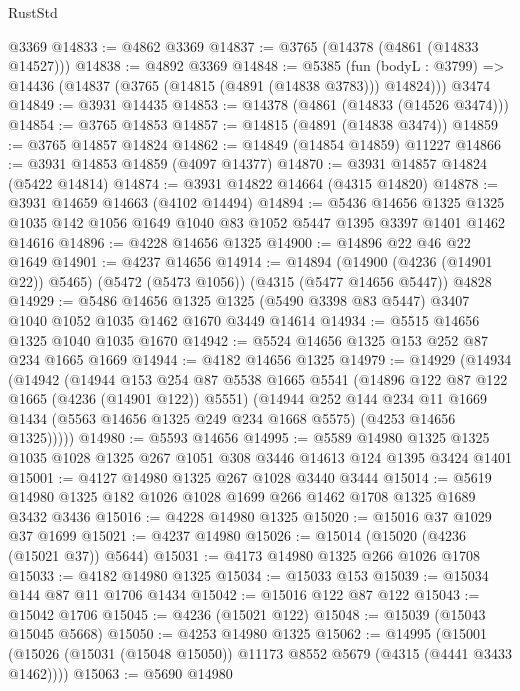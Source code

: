 \begin{lexlean}{RustStd}
\begin{coremodule}
    @3369
@14833 := @4862 @3369
@14837 := @3765 (@14378 (@4861 (@14833 @14527)))
@14838 := @4892 @3369
@14848 := @5385
    (fun (bodyL : @3799) => @14436 (@14837 (@3765 (@14815 (@4891 (@14838 @3783))) @14824)))
    @3474
@14849 := @3931 @14435
@14853 := @14378 (@4861 (@14833 (@14526 @3474)))
@14854 := @3765 @14853
@14857 := @14815 (@4891 (@14838 @3474))
@14859 := @3765 @14857 @14824
@14862 := @14849 (@14854 @14859) @11227
@14866 := @3931 @14853 @14859 (@4097 @14377)
@14870 := @3931 @14857 @14824 (@5422 @14814)
@14874 := @3931 @14822 @14664 (@4315 @14820)
@14878 := @3931 @14659 @14663 (@4102 @14494)
@14894 := @5436
    @14656
    @1325
    @1325
    @1035
    @142
    @1056
    @1649
    @1040
    @83
    @1052
    @5447
    @1395
    @3397
    @1401
    @1462
    @14616
@14896 := @4228 @14656 @1325
@14900 := @14896 @22 @46 @22 @1649
@14901 := @4237 @14656
@14914 := @14894
    (@14900 (@4236 (@14901 @22)) @5465)
    (@5472 (@5473 @1056))
    (@4315 (@5477 @14656 @5447))
    @4828
@14929 := @5486
    @14656
    @1325
    @1325
    (@5490 @3398 @83 @5447)
    @3407
    @1040
    @1052
    @1035
    @1462
    @1670
    @3449
    @14614
@14934 := @5515 @14656 @1325 @1040 @1035 @1670
@14942 := @5524 @14656 @1325 @153 @252 @87 @234 @1665 @1669
@14944 := @4182 @14656 @1325
@14979 := @14929
    (@14934
      (@14942
        (@14944
          @153
          @254
          @87
          @5538
          @1665
          @5541
          (@14896 @122 @87 @122 @1665 (@4236 (@14901 @122)) @5551)
          (@14944
            @252
            @144
            @234
            @11
            @1669
            @1434
            (@5563 @14656 @1325 @249 @234 @1668 @5575)
            (@4253 @14656 @1325)))))
@14980 := @5593 @14656
@14995 := @5589
    @14980
    @1325
    @1325
    @1035
    @1028
    @1325
    @267
    @1051
    @308
    @3446
    @14613
    @124
    @1395
    @3424
    @1401
@15001 := @4127 @14980 @1325 @267 @1028 @3440 @3444
@15014 := @5619 @14980 @1325 @182 @1026 @1028 @1699 @266 @1462 @1708 @1325 @1689 @3432 @3436
@15016 := @4228 @14980 @1325
@15020 := @15016 @37 @1029 @37 @1699
@15021 := @4237 @14980
@15026 := @15014 (@15020 (@4236 (@15021 @37)) @5644)
@15031 := @4173 @14980 @1325 @266 @1026 @1708
@15033 := @4182 @14980 @1325
@15034 := @15033 @153
@15039 := @15034 @144 @87 @11 @1706 @1434
@15042 := @15016 @122 @87 @122
@15043 := @15042 @1706
@15045 := @4236 (@15021 @122)
@15048 := @15039 (@15043 @15045 @5668)
@15050 := @4253 @14980 @1325
@15062 := @14995
    (@15001 (@15026 (@15031 (@15048 @15050)) @11173 @8552 @5679 (@4315 (@4441 @3433 @1462))))
@15063 := @5690 @14980

\end{coremodule}
\end{lexlean}
